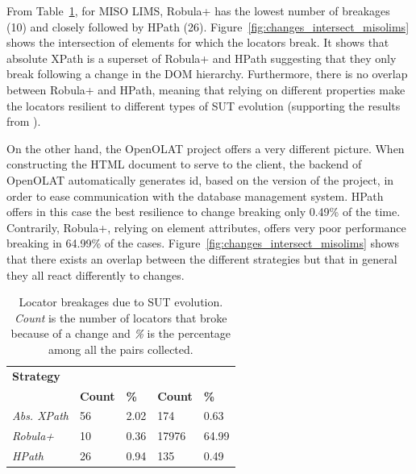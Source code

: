 From Table~\ref{tab:locator_breakage}, for MISO LIMS, Robula+ has the lowest number of breakages (10) and closely followed by HPath (26). Figure~\ref{fig:changes_intersect_misolims} shows the intersection of elements for which the locators break. It shows that absolute XPath is a superset of Robula+ and HPath suggesting that they only break following a change in the DOM hierarchy. Furthermore, there is no overlap between Robula+ and HPath, meaning that relying on different properties make the locators resilient to different types of SUT evolution (supporting the results from \citep{Leotta2015}).

On the other hand, the OpenOLAT project offers a very different picture. When constructing the HTML document to serve to the client, the backend of OpenOLAT automatically generates id, based on the version of the project, in order to ease communication with the database management system. HPath offers in this case the best resilience to change breaking only 0.49\% of the time. Contrarily, Robula+, relying on element attributes, offers very poor performance breaking in 64.99\% of the cases. Figure~\ref{fig:changes_intersect_misolims} shows that there exists an overlap between the different strategies but that in general they all react differently to changes.

\begin{table}
\centering
\caption{Locator breakages due to SUT evolution. \emph{Count} is the number of locators that broke because of a change and \emph{\%} is the percentage among all the pairs collected.}
\label{tab:locator_breakage}
\begin{tabular}{>{\raggedright}m{0.6in}>{\raggedleft}m{0.4in} >{\raggedleft}m{0.2in}>{\raggedleft}m{0.4in} >{\raggedleft}m{0.2in}}
\toprule
\textbf{\scriptsize{Strategy}} & \multicolumn{2}{c}{\textbf{\scriptsize{MISO LIMS}}} & \multicolumn{2}{c}{\textbf{\scriptsize{OpenOLAT}}}\tabularnewline
    & \textbf{\scriptsize{Count}} & \textbf{\scriptsize{\%}} & \textbf{\scriptsize{Count}} & \textbf{\scriptsize{\%}}\tabularnewline
\toprule
\scriptsize{\textit{Abs. XPath}} & \scriptsize{56} & \scriptsize{2.02} & \scriptsize{174} & \scriptsize{0.63}\tabularnewline
\scriptsize{\textit{Robula+}} & \scriptsize{10} & \scriptsize{0.36} & \scriptsize{17976} & \scriptsize{64.99}\tabularnewline
\scriptsize{\textit{HPath}} & \scriptsize{26} & \scriptsize{0.94} & \scriptsize{135} & \scriptsize{0.49}\tabularnewline
\bottomrule
\end{tabular}
\end{table}

